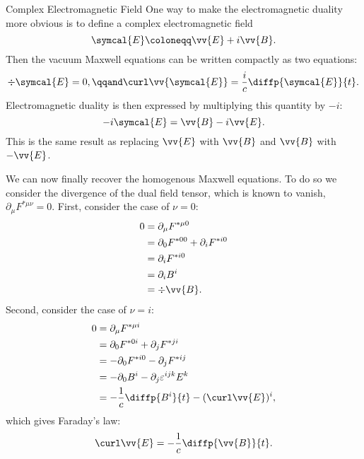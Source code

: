 \begin{app}{Complex Electromagnetic Field}{}
    One way to make the electromagnetic duality more obvious is to define a complex electromagnetic field
    \begin{equation}
        \symcal{E} \coloneqq \vv{E} + i\vv{B}.
    \end{equation}
    Then the vacuum Maxwell equations can be written compactly as two equations:
    \begin{equation}
        \div\symcal{E} = 0, \qqand \curl \vv{\symcal{E}} = \frac{i}{c}\diffp{\symcal{E}}{t}.
    \end{equation}
    Electromagnetic duality is then expressed by multiplying this quantity by \(-i\):
    \begin{equation}
        -i\symcal{E} = \vv{B} - i\vv{E}.
    \end{equation}
    This is the same result as replacing \(\vv{E}\) with \(\vv{B}\) and \(\vv{B}\) with \(-\vv{E}\).
\end{app}

We can now finally recover the homogenous Maxwell equations.
To do so we consider the divergence of the dual field tensor, which is known to vanish, \(\partial_\mu F^{*\mu\nu} = 0\).
First, consider the case of \(\nu = 0\):
\begin{align}
    0 &= \partial_\mu F^{*\mu0}\\
    &= \partial_0 F^{*00} + \partial_i F^{*i0}\\
    &= \partial_i F^{*i0}\\
    &= \partial_i B^i\\
    &= \div\vv{B}.
\end{align}
Second, consider the case of \(\nu = i\):
\begin{align}
    0 &= \partial_\mu F^{*\mu i}\\
    &= \partial_0 F^{*0i} + \partial_jF^{*ji}\\
    &= -\partial_0 F^{*i0} - \partial_j F^{*ij}\\
    &= -\partial_0 B^i - \partial_j \varepsilon^{ijk}E^k\\
    &= -\frac{1}{c}\diffp{B^i}{t} - (\curl\vv{E})^{i},
\end{align}
which gives Faraday's law:
\begin{equation}
    \curl\vv{E} = -\frac{1}{c}\diffp{\vv{B}}{t}.
\end{equation}

